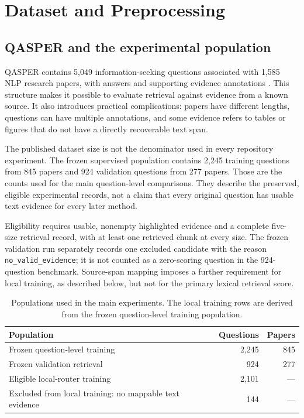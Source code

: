 \chapter{Dataset and Preprocessing}
\label{ch:data}

\section{QASPER and the experimental population}
QASPER contains 5,049 information-seeking questions associated with 1,585
NLP research papers, with answers and supporting evidence annotations
\cite{dasigi2021qasper}. This structure makes it possible to evaluate
retrieval against evidence from a known source. It also introduces
practical complications: papers have different lengths, questions can
have multiple annotations, and some evidence refers to tables or figures
that do not have a directly recoverable text span.

The published dataset size is not the denominator used in every
repository experiment. The frozen supervised population contains 2,245
training questions from 845 papers and 924 validation questions from
277 papers. Those are the counts used for the main question-level
comparisons. They describe the preserved, eligible experimental records,
not a claim that every original question has usable text evidence for
every later method.

Eligibility requires usable, nonempty highlighted evidence and a
complete five-size retrieval record, with at least one retrieved chunk
at every size. The frozen validation run separately records one
excluded candidate with the reason \texttt{no\_valid\_evidence}; it is
not counted as a zero-scoring question in the 924-question benchmark.
Source-span mapping imposes a further requirement for local training,
as described below, but not for the primary lexical retrieval score.

\begin{table}[tbp]
\centering
\caption{Populations used in the main experiments. The local training
rows are derived from the frozen question-level training population.}
\label{tab:populations}
\begin{tabularx}{\textwidth}{@{}Xrr@{}}
\toprule
Population & Questions & Papers\\
\midrule
Frozen question-level training & 2,245 & 845\\
Frozen validation retrieval & 924 & 277\\
Eligible local-router training & 2,101 & ---\\
Excluded from local training: no mappable text evidence & 144 & ---\\
\bottomrule
\end{tabularx}
\end{table}

